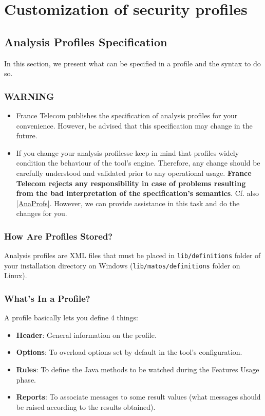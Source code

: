 \chapter{Customization of security profiles} \label{AdvancedUsage}


\section{Analysis Profiles Specification}\label{ProfFormalization}
In this section, we present what can be specified in a profile and the
syntax to do so.

\subsection*{WARNING} 
\begin{itemize}
\item France Telecom publishes the specification of
  analysis profiles for your convenience. However, be advised that this
  specification may change in the future. 
\item If you change your analysis profilesse keep in mind that
  profiles widely condition the behaviour of the tool's
  engine. Therefore, any change should be carefully understood and
  validated prior to any operational usage. \textbf{France Telecom rejects any
  responsibility in case of problems resulting from the bad
  interpretation of the specification's semantics}. Cf. also
  \ref{AnaProfs}. However, we can provide assistance in this task and
  do the changes for you.
\end{itemize}

\subsection{How Are Profiles Stored?}
Analysis profiles are XML files that must be placed in
\texttt{lib/definitions} folder of your installation directory on
Windows (\texttt{lib/matos/definitions} folder on Linux).

\subsection{What's In a Profile?}
A profile basically lets you define 4 things:
\begin{itemize}
\item \textbf{Header}: General information on the profile.
\item \textbf{Options}: To overload options set by default in the tool's
configuration.
\item \textbf{Rules}: To define the Java methods to be watched
during the Features Usage phase.
\item \textbf{Reports}: To associate messages to some result values (what messages
should be raised according to the results obtained).
\end{itemize}

